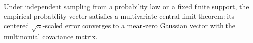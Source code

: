 Under independent sampling from a probability law on a fixed finite support, the empirical probability vector satisfies a multivariate central limit theorem: its centered \(\sqrt n\)-scaled error converges to a mean-zero Gaussian vector with the multinomial covariance matrix.